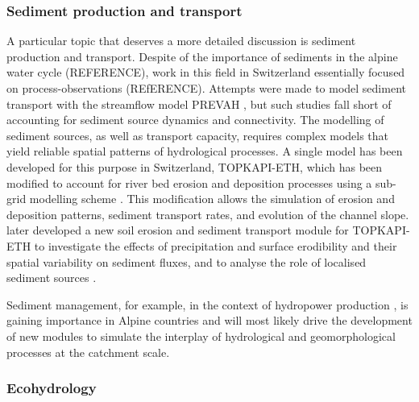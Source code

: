 \documentclass[10pt,a4paper]{article}
\begin{document}
\subsubsection{Sediment production and transport}
\label{sec:context:sediments}
A particular topic that deserves a more detailed discussion is sediment production and transport. Despite of the importance of sediments in the alpine water cycle (REFERENCE), work in this field in Switzerland essentially focused on process-observations (REfERENCE). Attempts were made to model sediment transport with the streamflow model PREVAH \citep{RaymondPralong2015}, but such studies fall short of accounting for sediment source dynamics and connectivity. The modelling of sediment sources, as well as transport capacity, requires complex models that yield reliable spatial patterns of hydrological processes. A single model has been developed for this purpose in Switzerland, TOPKAPI-ETH, which has been modified to account for river bed erosion and deposition processes using a sub-grid modelling scheme \citep{Konz2011}. This modification allows the simulation of erosion and deposition patterns, sediment transport rates, and evolution of the channel slope. \citet{Battista2020a} later developed a new soil erosion and sediment transport module for TOPKAPI-ETH to investigate the effects of precipitation and surface erodibility and their spatial variability on sediment fluxes, and to analyse the role of localised sediment sources \citep{Battista2020}. 

Sediment management, for example, in the context of hydropower production \citep{RaymondPralong2015, Gabbud2016}, is gaining importance in Alpine countries and will most likely drive the development of new modules to simulate the interplay of hydrological and geomorphological processes at the catchment scale. 


\subsubsection{Ecohydrology}
\label{sec:context:ecohydrology}
\end{document}
